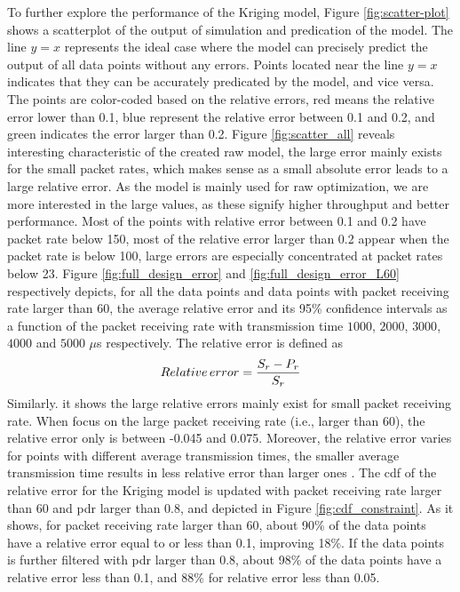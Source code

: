 To further explore the performance of the Kriging model, Figure \ref{fig:scatter-plot}  shows a scatterplot of the output of simulation and predication of the model.
The line  $y=x$ represents the ideal case where the model can precisely predict the output of all data points without any errors. Points located near the line $y=x$ indicates that they can be accurately predicated by the model, and vice versa. The points are color-coded based on the relative errors, red means the relative error lower than 0.1, blue represent the relative error between 0.1 and 0.2, and green indicates the error larger than 0.2. Figure \ref{fig:scatter_all} reveals interesting characteristic of the created \gls{raw} model, the large error mainly exists for the small packet rates, which makes sense as a small absolute error leads to a large relative error. As the model is mainly used for \gls{raw} optimization, we are more interested in the large values, as these signify higher throughput and better performance. Most of the points with relative error between 0.1 and 0.2 have packet rate below 150, most of the relative error larger than 0.2 appear when the packet rate is below 100, large errors are especially concentrated at packet rates below 23. Figure \ref{fig:full_design_error} and \ref{fig:full_design_error_L60} respectively depicts, for all the data points and data points with packet receiving rate larger than 60, the average relative error and its 95\% confidence intervals as a function of the packet receiving rate with transmission time $1000$, $2000$, $3000$, $4000$ and $5000$ $\mu$s respectively. The relative error is defined as 
\begin{equation}
Relative \thinspace error = \frac{{S_r - P_r} }{S_r} 
\end{equation}
Similarly. it shows the large relative errors mainly exist for small packet receiving rate. When focus on the large packet receiving rate (i.e., larger than 60), the relative error only is between -0.045 and 0.075. Moreover, the relative error varies for points with different average transmission times, the smaller average transmission time results in less relative error than larger ones . The \gls{cdf} of the relative error for the Kriging model is updated with packet receiving rate larger than 60 and \gls{pdr} larger than 0.8, and depicted in Figure \ref{fig:cdf_constraint}. As it shows, for packet receiving rate larger than 60, about 90\% of the data points have a relative error equal to or less than 0.1, improving 18\%. If the data points is further filtered with \gls{pdr} larger than 0.8, about 98\% of the data points have a relative error less than 0.1, and 88\% for relative error less than 0.05.



